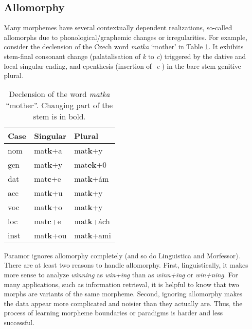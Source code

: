 \documentclass{itatnew}
\newcommand{\gloss}[2]{\emph{#1} ``#2''}
\newcommand{\e}[1]{\textit{#1}} %
\begin{document}

\subsection{Allomorphy}


\noindent
Many morphemes have several contextually dependent realizations,  so-called
allomorphs due to phonological/graphemic changes or irregularities. For example, consider the declension of the Czech word \e{matka} `mother' in Table \ref{table:matka}. It exhibits stem-final conso\-nant chan\-ge (palatalisation of \e{k} to \e{c}) triggered by the dative and local singular ending, and epenthesis (insertion of \e{-e-}) in the bare stem genitive plural.

\begin{table}[h]
\begin{center}
\begin{tabular}{|l|ll|}
\hline \bf Case & \bf Singular & \bf Plural \\ \hline
nom & mat\textbf{k}+a & mat\textbf{k}+y \\
gen & mat\textbf{k}+y & mat\textbf{ek}+0 \\
dat & mat\textbf{c}+e & mat\textbf{k}+ám\\
acc & mat\textbf{k}+u & mat\textbf{k}+y \\
voc & mat\textbf{k}+o & mat\textbf{k}+y \\
loc & mat\textbf{c}+e & mat\textbf{k}+ách \\
inst & mat\textbf{k}+ou & mat\textbf{k}+ami \\
\hline
\end{tabular}
\end{center}
\caption{\label{table:matka} Declension of the word \gloss{matka}{mother}. Changing part of the stem is in bold.}
\end{table}


Paramor ignores allomorphy completely (and so do Linguistica and Morfessor).
%
There are at least two reasons to handle allomorphy.
%
First, linguistically,
it  makes  more  sense  to  analyze  \e{winning}  as  \e{win+ing} than as  \e{winn+ing} or \e{win+ning}. For  many  applications, such as information retrieval, it is helpful to know that two morphs are variants of the same morpheme.
%
Second, ignoring allomorphy makes the data appear more complicated and noisier than they actually are. Thus, the process of learning morpheme boundaries or paradigms is harder and less successful.
\end{document}
